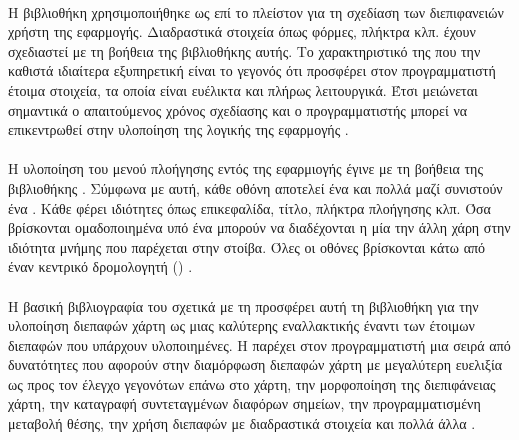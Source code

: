 \paragraph{}
Η βιβλιοθήκη  χρησιμοποιήθηκε ως επί το πλείστον για τη σχεδίαση των διεπιφανειών χρήστη της εφαρμογής. Διαδραστικά στοιχεία όπως φόρμες, πλήκτρα κλπ. έχουν σχεδιαστεί με τη βοήθεια της βιβλιοθήκης αυτής. Το χαρακτηριστικό της  που την καθιστά ιδιαίτερα εξυπηρετική είναι το γεγονός ότι προσφέρει στον προγραμματιστή έτοιμα στοιχεία, τα οποία είναι ευέλικτα και πλήρως λειτουργικά. Έτσι μειώνεται σημαντικά ο απαιτούμενος χρόνος σχεδίασης και ο προγραμματιστής μπορεί να επικεντρωθεί στην υλοποίηση της λογικής της εφαρμογής \cite{[NB]}.


\paragraph{}
\paragraph{}
Η υλοποίηση του μενού πλοήγησης εντός της εφαρμιογής έγινε με τη βοήθεια της βιβλιοθήκης . Σύμφωνα με αυτή, κάθε οθόνη αποτελεί ένα  και πολλά  μαζί συνιστούν ένα . Κάθε  φέρει ιδιότητες όπως επικεφαλίδα, τίτλο, πλήκτρα πλοήγησης κλπ. Όσα  βρίσκονται ομαδοποιημένα υπό ένα  μπορούν να διαδέχονται η μία την άλλη χάρη στην ιδιότητα μνήμης που παρέχεται στην στοίβα. Όλες οι οθόνες βρίσκονται κάτω από έναν κεντρικό δρομολογητή () \cite{[RNRF]}.


\paragraph{}
\paragraph{}
Η βασική βιβλιογραφία του  σχετικά με τη  προσφέρει αυτή τη βιβλιοθήκη για την υλοποίηση διεπαφών χάρτη ως μιας καλύτερης εναλλακτικής έναντι των έτοιμων διεπαφών που υπάρχουν υλοποιημένες. Η  παρέχει στον προγραμματιστή μια σειρά από δυνατότητες που αφορούν στην διαμόρφωση διεπαφών χάρτη με μεγαλύτερη ευελιξία ως προς τον έλεγχο γεγονότων επάνω στο χάρτη, την μορφοποίηση της διεπιφάνειας χάρτη, την καταγραφή συντεταγμένων διαφόρων σημείων, την προγραμματισμένη μεταβολή θέσης, την χρήση διεπαφών με διαδραστικά στοιχεία και πολλά άλλα \cite{RNM}.



